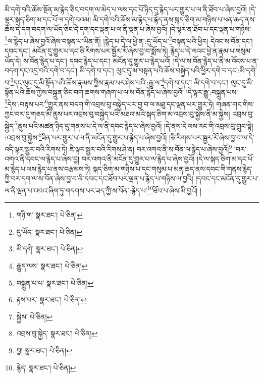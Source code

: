 མི་དགེ་བའི་ཆོས་སྔོན་མ་རྙེད་ཅིང་བདག་ལ་མེད་པ་ལས་དང་པོ་ཉིད་དུ་རྙེད་པར་གྱུར་པ་ལ་ནི་ཐོབ་པ་ཞེས་བྱའོ། །དེ་ལྟར་སྐད་ཅིག་མ་དང་པོ་ལ་དགེ་བའམ། མི་དགེ་བའི་ཆོས་མ་རྙེད་པ་རྙེད་ནས་སྐད་ཅིག་མ་གཉིས་པ་ཕན་ཆད་ནས་ཆོས་དེ་དག་བདག་ལ་ཡོད་ཅིང་དེ་དག་དང་ལྡན་པ་ལ་ནི་ལྡན་པ་ཞེས་བྱའོ། །དེ་ལྟར་ན་ཐོབ་པ་དང་ལྡན་པ་གཉིས་\footnote{གཉི་ག་  སྣར་ཐང་།  པེ་ཅིན། }ལ་རྙེད་པ་ཞེས་བྱའོ་ཞེས་བསྟན་པ་ཡིན་ནོ། །རྙེད་པ་དེ་ལ་ཕྱེ་ན་:དུ་ཡོད་པ་\footnote{དུ་ཡོད་  སྣར་ཐང་།  པེ་ཅིན། }བསྟན་པའི་ཕྱིར། དེའང་ས་བོན་དང་། དབང་དང་། མངོན་དུ་གྱུར་པ་དང་ཅི་རིགས་པར་སྦྱོར་རོ་ཞེས་བྱ་བ་སྨོས་ཏེ། རྙེད་པ་དེ་ལའང་ཕྱེ་ན་རྣམ་པ་གསུམ་ཡོད་དེ། ས་བོན་རྙེད་པ་དང་། དབང་རྙེད་པ་དང་། མངོན་དུ་གྱུར་པ་རྙེད་པའོ། །དེ་ལ་ས་བོན་རྙེད་པ་ནི་མ་འོངས་པ་ན་བདག་དང་འདྲ་བའི་དགེ་བ་དང་། མི་དགེ་བ་དང་། ལུང་དུ་མ་བསྟན་པའི་ཆོས་བསྐྱེད་པའི་ཕྱིར་དགེ་བ་དང་:མི་དགེ་བ་\footnote{མི་དགེ་  སྣར་ཐང་།  པེ་ཅིན། }དང་ལུང་དུ་མི་སྟོན་པའི་ཆོས་རྣམས་ཀྱིས་རྣམ་པར་ཤེས་པའི་:རྒྱུ་ལ་\footnote{རྒྱུད་ལས་  སྣར་ཐང་།  པེ་ཅིན། }དགེ་བ་དང་། མི་དགེ་བ་དང་། ལུང་དུ་མི་སྟོན་པའི་ཆོས་ཀྱིས་བསྐྲུན་ཅིང་བག་ཆགས་གཞག་པ་ལ་ས་བོན་རྙེད་པ་ཞེས་བྱའོ། །དེ་ལྟར་རྒྱུ་:བསྐྲུན་པས་\footnote{བསྐྲུན་པ་པ་  སྣར་ཐང་།  པེ་ཅིན། }དེས་:བརྟས་པར་\footnote{རྟས་པར་  སྣར་ཐང་།  པེ་ཅིན། }གྱུར་ནས་བདག་གི་འབྲས་བུ་བསྐྱེད་པར་བྱ་བ་ལ་མཐུ་དང་ལྡན་པར་གྱུར་ཏེ། གཞན་གང་གིས་ཀྱང་བར་དུ་གཅད་མི་ནུས་པར་འབྲས་བུ་བསྐྱེད་པའི་མཐའ་མའི་སྐད་ཅིག་མ་འབྲས་བུ་སྐྱེས་ནི་མ་སྐྱེས། འབྲས་བུ་སྐྱེད་\footnote{སྐྱེས་  པེ་ཅིན། }ནུས་པའི་མཚན་ཉིད་དུ་གནས་པ་དེ་ལ་ནི་དབང་རྙེད་པ་ཞེས་བྱའོ། །དེ་ནས་དེ་ལས་རང་གི་འབྲས་བུ་གྲུབ་སྟེ། :འབྲས་བུ་སྐྱེས་\footnote{འབྲས་བུ་སྐྱེད་  སྣར་ཐང་།  པེ་ཅིན། }ཟིན་པར་གྱུར་པ་ལ་ནི་མངོན་དུ་གྱུར་པ་རྙེད་པ་ཞེས་བྱའོ། །ཅི་རིགས་པར་སྦྱར་རོ་ཞེས་བྱ་བ་ལ་དེ་འདི་ལྟར་སྦྱར་བའི་རིགས་ཏེ། ཇི་ལྟར་སྦྱར་བའི་རིགས་ཤེ་ན། བར་འགའ་ནི་ས་བོན་ལ་རྙེད་པ་ཞེས་བྱའོ།\footnote{བྱ།  སྣར་ཐང་།  པེ་ཅིན། } །བར་འགའ་ནི་དབང་ལ་རྙེད་པ་ཞེས་བྱ། བར་འགའ་ནི་མངོན་དུ་གྱུར་པ་ལ་རྙེད་པ་ཞེས་བྱའོ། །དེ་ལ་སྐད་ཅིག་མ་དང་པོ་མ་རྙེད་པ་ལས་རྙེད་པ་ནས་བརྩམས་ཏེ། སྐད་ཅིག་མ་གཉིས་པ་དང་གསུམ་པ་མན་ཆད་ནས་དབང་གི་གནས་རྙེད་ཀྱི་བར་དག་ལ་ས་བོན་ཞེས་བྱ་བ་ནི་དབང་དང་ཐོབ་པར་ལྡན་པ་རྙེད་པ་གཉིས་ལ་བྱའི། །དབང་དང་མངོན་དུ་གྱུར་པ་ལ་ནི་ལྡན་པ་འབའ་ཞིག་ཏུ་གདགས་པར་ཟད་ཀྱི་ས་བོན་:རྙེད་པ་\footnote{རྙེད་  སྣར་ཐང་།  པེ་ཅིན། }ཐོབ་པ་ཞེས་མི་བྱའོ། །
